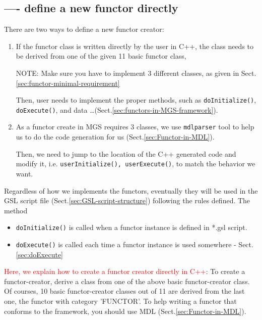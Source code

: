 \subsection{---- define a new functor directly}
\label{sec:functor-how-to-implement-new-functor-creator}

There are two ways to define a new functor creator:
\begin{enumerate}
  
  \item  If the functor class is written directly by the user in C++, the class
  needs to be derived from one of the given 11 basic functor class,
  
  NOTE: Make sure you have to implement 3 different classes, as given in
  Sect.\ref{sec:functor-minimal-requirement}
  
Then, user needs to implement the proper methods, such as \verb!doInitialize()!,
\verb!doExecute()!, and data \ldots (Sect.\ref{sec:functors-in-MGS-framework}).
  
  \item  As a functor create in MGS requires 3 classes, we use \verb!mdlparser!
  tool to help us to do the code generation for us (Sect.\ref{sec:Functor-in-MDL}).

Then, we need to jump to the location of the C++ generated code and modify it, 
i.e. \verb!userInitialize(), userExecute()!,  to match the behavior we want.
  
\end{enumerate}

Regardless of how we implements the functors, eventually they will be used in
the GSL script file (Sect.\ref{sec:GSL-script-structure}) following the rules
defined. The method

\begin{itemize}
  \item \verb!doInitialize()! is called when a functor instance is defined in
  *.gsl script.
   
  \item \verb!doExecute()! is called each time a functor instance is used
  somewhere - Sect.\ref{sec:doExecute}
\end{itemize}

\textcolor{red}{Here, we explain how to create a functor creator directly in
C++}: To create a functor-creator, derive a class from one of the above basic
functor-creator class. Of courses, 10 basic functor-creator classes out of 11
are derived from the last one, the functor with category 'FUNCTOR'. To help
writing a functor that conforms to the framework, you should use MDL
(Sect.\ref{sec:Functor-in-MDL}).

